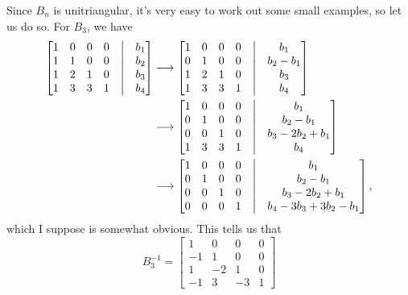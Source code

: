 \documentclass[a4paper, 12pt]{article}
\begin{document}
\begin{idea}
    Since \( B_n \) is unitriangular, it's very easy to work out some small examples, so let us do so. For \( B_3 \), we have
    \begin{align*}
        \begin{bmatrix}
            1 & 0 & 0 & 0 & \bigm| & b_1 \\
            1 & 1 & 0 & 0 & \bigm| & b_2 \\
            1 & 2 & 1 & 0 & \bigm| & b_3 \\
            1 & 3 & 3 & 1 & \bigm| & b_4
        \end{bmatrix} &\longrightarrow
        \begin{bmatrix}
            1 & 0 & 0 & 0 & \bigm| & b_1 \\
            0 & 1 & 0 & 0 & \bigm| & b_2 - b_1 \\
            1 & 2 & 1 & 0 & \bigm| & b_3 \\
            1 & 3 & 3 & 1 & \bigm| & b_4
        \end{bmatrix} \\
        &\longrightarrow 
        \begin{bmatrix}
            1 & 0 & 0 & 0 & \bigm| & b_1 \\
            0 & 1 & 0 & 0 & \bigm| & b_2 - b_1 \\
            0 & 0 & 1 & 0 & \bigm| & b_3 - 2b_2 + b_1 \\
            1 & 3 & 3 & 1 & \bigm| & b_4
        \end{bmatrix} \\
        &\longrightarrow 
        \begin{bmatrix}
            1 & 0 & 0 & 0 & \bigm| & b_1 \\
            0 & 1 & 0 & 0 & \bigm| & b_2 - b_1 \\
            0 & 0 & 1 & 0 & \bigm| & b_3 - 2b_2 + b_1 \\
            0 & 0 & 0 & 1 & \bigm| & b_4 - 3b_3 + 3b_2 - b_1
        \end{bmatrix}
    ,\end{align*}
    which I suppose is somewhat obvious. This tells us that
    \[
        B_3^{-1} = \begin{bmatrix}
            1 & 0 & 0 & 0 \\
            -1 & 1 & 0 & 0 \\
            1 & -2 & 1 & 0 \\
            -1 & 3 & -3 & 1
        \end{bmatrix}
\]
\end{idea}
\end{document}

